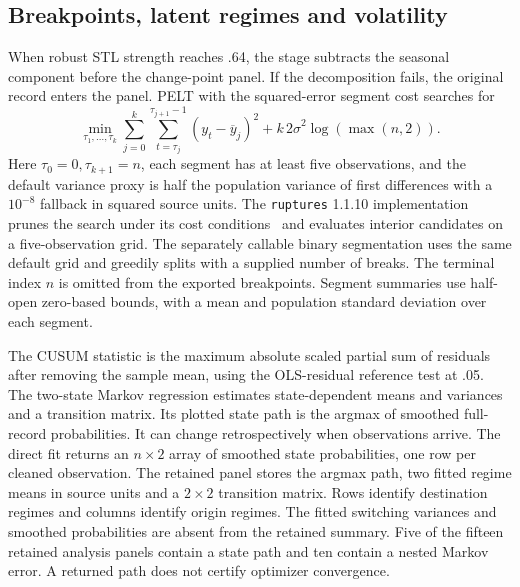 \subsection{Breakpoints, latent regimes and volatility}
\label{sec:diagnostic-breaks}
When robust STL strength reaches .64, the stage subtracts the seasonal component before the change-point panel. If the decomposition fails, the original record enters the panel. PELT with the squared-error segment cost searches for
\begin{equation}
 \min_{\tau_1,\ldots,\tau_k}
 \sum_{j=0}^{k}\sum_{t=\tau_j}^{\tau_{j+1}-1}(y_t-\overline y_j)^2
 + k\,2\widehat\sigma^2\log(\max(n,2)).
\end{equation}
Here $\tau_0=0,\tau_{k+1}=n$, each segment has at least five observations, and the default variance proxy is half the population variance of first differences with a $10^{-8}$ fallback in squared source units. The \texttt{ruptures} 1.1.10 implementation prunes the search under its cost conditions~\cite{pelt} and evaluates interior candidates on a five-observation grid. The separately callable binary segmentation uses the same default grid and greedily splits with a supplied number of breaks. The terminal index $n$ is omitted from the exported breakpoints. Segment summaries use half-open zero-based bounds, with a mean and population standard deviation over each segment.

The CUSUM statistic is the maximum absolute scaled partial sum of residuals after removing the sample mean, using the OLS-residual reference test at .05. The two-state Markov regression estimates state-dependent means and variances and a transition matrix. Its plotted state path is the argmax of smoothed full-record probabilities. It can change retrospectively when observations arrive. The direct fit returns an $n\times 2$ array of smoothed state probabilities, one row per cleaned observation. The retained panel stores the argmax path, two fitted regime means in source units and a $2\times 2$ transition matrix. Rows identify destination regimes and columns identify origin regimes. The fitted switching variances and smoothed probabilities are absent from the retained summary. Five of the fifteen retained analysis panels contain a state path and ten contain a nested Markov error. A returned path does not certify optimizer convergence.

